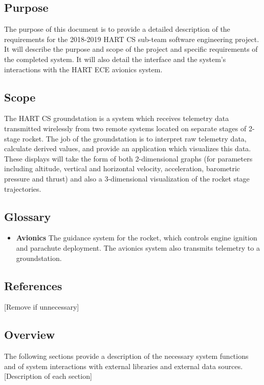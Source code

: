\documentclass[onecolumn, draftclsnofoot,10pt, compsoc]{IEEEtran}
\begin{document}
		\subsection{Purpose}
			The purpose of this document is to provide a detailed description of the requirements for the 2018-2019 HART CS sub-team software engineering project. 
			It will describe the purpose and scope of the project and specific requirements of the completed system. 
			It will also detail the interface and the system's interactions with the HART ECE avionics system.

		\subsection{Scope}
			The HART CS groundstation is a system which receives telemetry data transmitted wirelessly from two remote systems located on separate stages of 2-stage rocket. 
			The job of the groundstation is to interpret raw telemetry data, calculate derived values, and provide an application which visualizes this data.
			These displays will take the form of both 2-dimensional graphs (for parameters including altitude, vertical and horizontal velocity, acceleration, barometric pressure and thrust) and also a 3-dimensional visualization of the rocket stage trajectories.

		\subsection{Glossary}
			\begin{itemize}
				\item \textbf{Avionics}
					The guidance system for the rocket, which controls engine ignition and parachute deployment.
					The avionics system also transmits telemetry to a groundstation.

			\end{itemize}

		\subsection{References}
			[Remove if unnecessary]

		\subsection{Overview}
			The following sections provide a description of the necessary system functions and of system interactions with external libraries and external data sources.
			[Description of each section]
\end{document}
